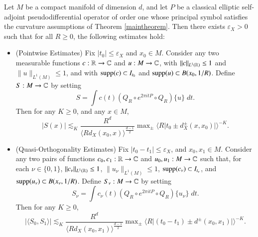 \begin{prop} \label{theMainEstimatesForWave}
    Let $M$ be a compact manifold of dimension $d$, and let $P$ be a classical elliptic self-adjoint pseudodifferential operator of order one whose principal symbol satisfies the curvature assumptions of Theorem \ref{maintheorem}. Then there exists $\varepsilon_X > 0$ such that for all $R \geq 0$, the following estimates hold:
    \begin{itemize}%
        \item (Pointwise Estimates) Fix  $|t_0| \leq \varepsilon_X$ and $x_0 \in M$. Consider any two measurable functions $c: \operatorname{\mathbb{R}} \to \operatorname{\mathbb{C}}$ and $u: M \to \operatorname{\mathbb{C}}$, with $\| c \|_{L^1(\operatorname{\mathbb{R}})} \leq 1$ and $\| u \|_{L^1(M)} \leq 1$, and with $\operatorname{\text{supp}}(c) \subset I_{t_0}$ and $\operatorname{\text{supp}}(u) \subset B(x_0,1/R)$. Define $S: M \to \operatorname{\mathbb{C}}$ by setting
        \[ S = \int c(t) (Q_R \circ e^{2 \pi i t P} \circ Q_R) \{ u \}\; dt. \]
        Then for any $K \geq 0$, and any $x \in M$,
        \[ |S(x)| \lesssim_K \frac{R^d}{\langle R d_X(x_0,x) \rangle^{\frac{d-1}{2}}} \max\nolimits_{\pm} \Big\langle R \big| t_0 \pm d_X^\pm(x,x_0) \big| \Big\rangle^{-K}. \]

        \item (Quasi-Orthogonality Estimates) Fix $|t_0 - t_1| \leq \varepsilon_X$, and $x_0, x_1 \in M$. Consider any two pairs of functions $c_0,c_1: \operatorname{\mathbb{R}} \to \operatorname{\mathbb{C}}$ and $u_0,u_1: M \to \operatorname{\mathbb{C}}$ such that, for each $\nu \in \{ 0, 1 \}$, $\| c_\nu \|_{L^1(\operatorname{\mathbb{R}})} \leq 1$, $\| u_\nu \|_{L^1(M)} \leq 1$, $\operatorname{\text{supp}}(c_\nu) \subset I_{t_\nu}$, and $\operatorname{\text{supp}}(u_\nu) \subset B(x_\nu,1/R)$. Define $S_\nu: M \to \operatorname{\mathbb{C}}$ by setting
        \[ S_\nu = \int c_\nu(t) (Q_R \circ e^{2 \pi i t P} \circ Q_R) \{ u_\nu \}\; dt. \]
        Then for any $K \geq 0$,
        \[ \left| \langle S_0, S_1 \rangle \right| \lesssim_K \frac{R^d}{\langle R d_X(x_0,x_1) \rangle^{\frac{d-1}{2}}} \max\nolimits_{\pm} \Big\langle R \big| (t_0 - t_1) \pm d^\pm(x_0,x_1) \big| \Big\rangle^{-K}. \]
    \end{itemize}
\end{prop}

%

